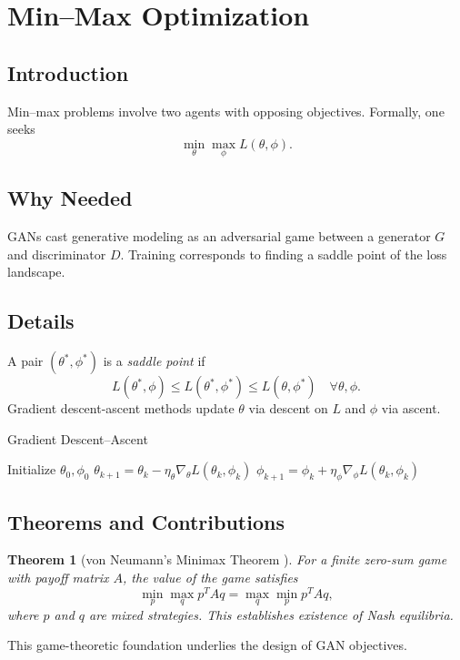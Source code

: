 \documentclass[11pt]{book}
\newtheorem{theorem}{Theorem}[chapter]
\begin{document}
\section{Min--Max Optimization}
\subsection{Introduction}
Min--max problems involve two agents with opposing objectives. Formally, one seeks
\begin{equation}
\min_{\theta} \max_{\phi} L(\theta,\phi).
\end{equation}

\subsection{Why Needed}
GANs cast generative modeling as an adversarial game between a generator $G$ and discriminator $D$. Training corresponds to finding a saddle point of the loss landscape.

\subsection{Details}
A pair $(\theta^*,\phi^*)$ is a \emph{saddle point} if
\begin{equation}
L(\theta^*,\phi)\le L(\theta^*,\phi^*)\le L(\theta,\phi^*)\quad\forall\theta,\phi.
\end{equation}
Gradient descent-ascent methods update $\theta$ via descent on $L$ and $\phi$ via ascent.

\begin{algorithm}
\caption{Gradient Descent--Ascent}
\begin{algorithmic}[1]
\STATE Initialize $\theta_0, \phi_0$
    \STATE $\theta_{k+1}=\theta_k-\eta_\theta\nabla_{\theta}L(\theta_k,\phi_k)$
    \STATE $\phi_{k+1}=\phi_k+\eta_\phi\nabla_{\phi}L(\theta_k,\phi_k)$
\ENDFOR
\end{algorithmic}
\end{algorithm}

\subsection{Theorems and Contributions}
\begin{theorem}[von Neumann's Minimax Theorem \cite{vonneumann1928}]
For a finite zero-sum game with payoff matrix $A$, the value of the game satisfies
\begin{equation}
\min_{p}\max_{q} p^T A q = \max_{q}\min_{p} p^T A q,
\end{equation}
where $p$ and $q$ are mixed strategies. This establishes existence of Nash equilibria.
\end{theorem}
This game-theoretic foundation underlies the design of GAN objectives.
\end{document}
